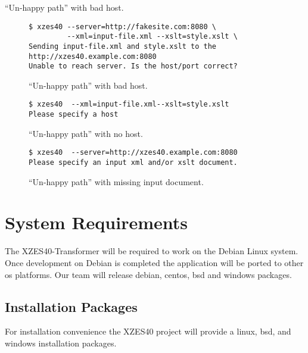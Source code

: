 ``Un-happy path'' with bad host.
\begin{figure}
\begin{lstlisting}
$ xzes40 --server=http://fakesite.com:8080 \
         --xml=input-file.xml --xslt=style.xslt \
Sending input-file.xml and style.xslt to the http://xzes40.example.com:8080
Unable to reach server. Is the host/port correct?
\end{lstlisting}
\caption{``Un-happy path'' with bad host.}
\end{figure}

\begin{figure}
\begin{lstlisting}
$ xzes40  --xml=input-file.xml--xslt=style.xslt
Please specify a host
\end{lstlisting}
\caption{``Un-happy path'' with no host.}
\end{figure}

\begin{figure}
\begin{lstlisting}
$ xzes40  --server=http://xzes40.example.com:8080
Please specify an input xml and/or xslt document.
\end{lstlisting}
\caption{``Un-happy path'' with missing input document.}
\end{figure}

\section{System Requirements}
\label{system-requirements}

The XZES40-Transformer will be required to work on the Debian Linux system.
Once development on Debian is completed the application will be ported to other \gls{os} platforms.
Our team will release \gls{debian}, \gls{centos}, \gls{bsd} and \gls{windows} packages.
  
\subsection{Installation Packages}
\label{installation-packages}

For installation convenience the XZES40 project will provide a \gls{linux}, \gls{bsd}, and \gls{windows} installation packages.

